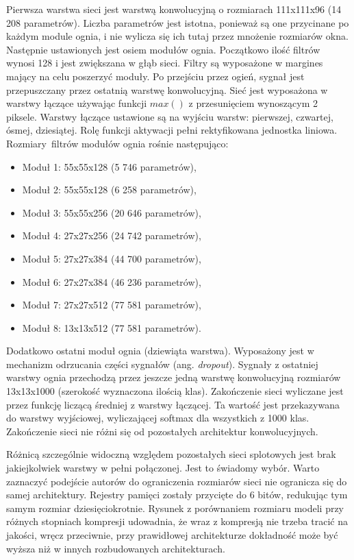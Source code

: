 \documentclass[12pt,a4paper,twoside,titlepage,openright]{book}
\begin{document}
\begin{itemize}
Pierwsza warstwa sieci jest warstwą konwolucyjną o rozmiarach 111x111x96 (14 208 parametrów). Liczba parametrów jest istotna, ponieważ są one przycinane po każdym module ognia, i nie wylicza się ich tutaj przez mnożenie rozmiarów okna. Następnie ustawionych jest osiem modułów ognia. Początkowo ilość filtrów wynosi 128 i jest zwiększana w głąb sieci. Filtry są wyposażone w margines mający na celu poszerzyć moduły. Po przejściu przez ogień, sygnał jest przepuszczany przez ostatnią warstwę konwolucyjną. Sieć jest wyposażona w warstwy łączące używając funkcji $max()$ z przesunięciem wynoszącym 2 piksele. Warstwy łączące ustawione są na wyjściu warstw: pierwszej, czwartej, ósmej, dziesiątej. Rolę funkcji aktywacji pełni rektyfikowana jednostka liniowa. Rozmiary filtrów modułów ognia rośnie następująco:
\begin{itemize}
\item Moduł 1: 55x55x128 (5 746 parametrów),
\item Moduł 2: 55x55x128 (6 258 parametrów), 
\item Moduł 3: 55x55x256 (20 646 parametrów),
\item Moduł 4: 27x27x256 (24 742 parametrów),
\item Moduł 5: 27x27x384 (44 700 parametrów),
\item Moduł 6: 27x27x384 (46 236 parametrów),
\item Moduł 7: 27x27x512 (77 581 parametrów),
\item Moduł 8: 13x13x512 (77 581 parametrów).
\end{itemize}
Dodatkowo ostatni moduł ognia (dziewiąta warstwa). Wyposażony jest w mechanizm odrzucania części sygnałów (ang. \textit{dropout}). Sygnały z ostatniej warstwy ognia przechodzą przez jeszcze jedną warstwę konwolucyjną rozmiarów 13x13x1000 (szerokość wyznaczona ilością klas).
Zakończenie sieci wyliczane jest przez funkcję liczącą średniej z warstwy łączącej. Ta wartość jest przekazywana do warstwy wyjściowej, wyliczającej softmax dla wszystkich z 1000 klas. Zakończenie sieci nie różni się od pozostałych architektur konwolucyjnych.

Różnicą szczególnie widoczną względem pozostałych sieci splotowych jest brak jakiejkolwiek warstwy w pełni połączonej. Jest to świadomy wybór. Warto zaznaczyć podejście autorów do ograniczenia rozmiarów sieci nie ogranicza się do samej architektury. Rejestry pamięci zostały przycięte do 6 bitów, redukując tym samym rozmiar dziesięciokrotnie. Rysunek z porównaniem rozmiaru modeli przy różnych stopniach kompresji udowadnia, że wraz z kompresją nie trzeba tracić na jakości, wręcz przeciwnie, przy prawidłowej architekturze dokładność może być wyższa niż w innych rozbudowanych architekturach. \cite{DBLP:journals/corr/IandolaMAHDK16}


\end{itemize}
\end{document}
